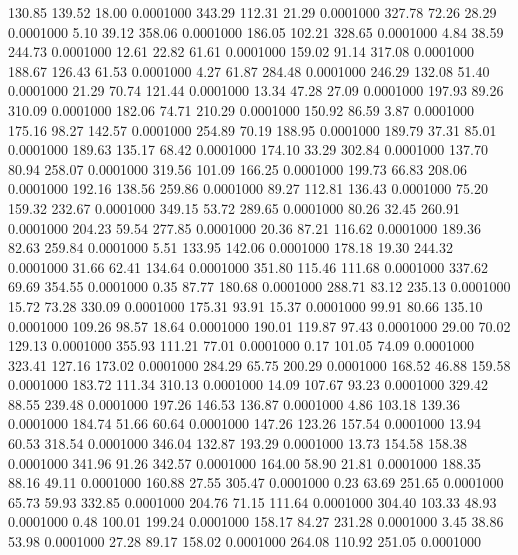  130.85  139.52   18.00   0.0001000
 343.29  112.31   21.29   0.0001000
 327.78   72.26   28.29   0.0001000
   5.10   39.12  358.06   0.0001000
 186.05  102.21  328.65   0.0001000
   4.84   38.59  244.73   0.0001000
  12.61   22.82   61.61   0.0001000
 159.02   91.14  317.08   0.0001000
 188.67  126.43   61.53   0.0001000
   4.27   61.87  284.48   0.0001000
 246.29  132.08   51.40   0.0001000
  21.29   70.74  121.44   0.0001000
  13.34   47.28   27.09   0.0001000
 197.93   89.26  310.09   0.0001000
 182.06   74.71  210.29   0.0001000
 150.92   86.59    3.87   0.0001000
 175.16   98.27  142.57   0.0001000
 254.89   70.19  188.95   0.0001000
 189.79   37.31   85.01   0.0001000
 189.63  135.17   68.42   0.0001000
 174.10   33.29  302.84   0.0001000
 137.70   80.94  258.07   0.0001000
 319.56  101.09  166.25   0.0001000
 199.73   66.83  208.06   0.0001000
 192.16  138.56  259.86   0.0001000
  89.27  112.81  136.43   0.0001000
  75.20  159.32  232.67   0.0001000
 349.15   53.72  289.65   0.0001000
  80.26   32.45  260.91   0.0001000
 204.23   59.54  277.85   0.0001000
  20.36   87.21  116.62   0.0001000
 189.36   82.63  259.84   0.0001000
   5.51  133.95  142.06   0.0001000
 178.18   19.30  244.32   0.0001000
  31.66   62.41  134.64   0.0001000
 351.80  115.46  111.68   0.0001000
 337.62   69.69  354.55   0.0001000
   0.35   87.77  180.68   0.0001000
 288.71   83.12  235.13   0.0001000
  15.72   73.28  330.09   0.0001000
 175.31   93.91   15.37   0.0001000
  99.91   80.66  135.10   0.0001000
 109.26   98.57   18.64   0.0001000
 190.01  119.87   97.43   0.0001000
  29.00   70.02  129.13   0.0001000
 355.93  111.21   77.01   0.0001000
   0.17  101.05   74.09   0.0001000
 323.41  127.16  173.02   0.0001000
 284.29   65.75  200.29   0.0001000
 168.52   46.88  159.58   0.0001000
 183.72  111.34  310.13   0.0001000
  14.09  107.67   93.23   0.0001000
 329.42   88.55  239.48   0.0001000
 197.26  146.53  136.87   0.0001000
   4.86  103.18  139.36   0.0001000
 184.74   51.66   60.64   0.0001000
 147.26  123.26  157.54   0.0001000
  13.94   60.53  318.54   0.0001000
 346.04  132.87  193.29   0.0001000
  13.73  154.58  158.38   0.0001000
 341.96   91.26  342.57   0.0001000
 164.00   58.90   21.81   0.0001000
 188.35   88.16   49.11   0.0001000
 160.88   27.55  305.47   0.0001000
   0.23   63.69  251.65   0.0001000
  65.73   59.93  332.85   0.0001000
 204.76   71.15  111.64   0.0001000
 304.40  103.33   48.93   0.0001000
   0.48  100.01  199.24   0.0001000
 158.17   84.27  231.28   0.0001000
   3.45   38.86   53.98   0.0001000
  27.28   89.17  158.02   0.0001000
 264.08  110.92  251.05   0.0001000
